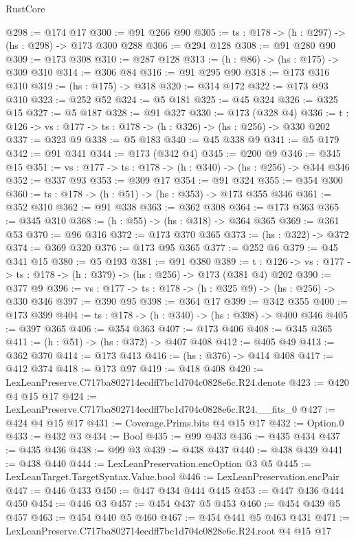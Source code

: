 \begin{lexlean}{RustCore}
\begin{coremodule}
@298 := @174 @17
@300 := @91 @266 @90
@305 := {ts : @178} -> (h : @297) -> (hs : @298) -> @173 @300 @288
@306 := @294 @128
@308 := @91 @280 @90
@309 := @173 @308
@310 := @287 @128
@313 := (h : @86) -> (hs : @175) -> @309 @310
@314 := @306 @84
@316 := @91 @295 @90
@318 := @173 @316 @310
@319 := (hs : @175) -> @318
@320 := @314 @172
@322 := @173 @93 @310
@323 := @252 @52
@324 := @5 @181
@325 := @45 @324
@326 := @325 @15
@327 := @5 @187
@328 := @91 @327
@330 := @173 (@328 @4)
@336 := {t : @126} -> {vs : @177} -> {ts : @178} -> (h : @326) -> (hs : @256) -> @330 @202
@337 := @323 @9
@338 := @5 @183
@340 := @45 @338 @9
@341 := @5 @179
@342 := @91 @341
@344 := @173 (@342 @4)
@345 := @200 @9
@346 := @345 @15
@351 := {vs : @177} -> {ts : @178} -> (h : @340) -> (hs : @256) -> @344 @346
@352 := @337 @93
@353 := @309 @17
@354 := @91 @324
@355 := @354 @300
@360 := {ts : @178} -> (h : @51) -> (hs : @353) -> @173 @355 @346
@361 := @352 @310
@362 := @91 @338
@363 := @362 @308
@364 := @173 @363
@365 := @345 @310
@368 := (h : @55) -> (hs : @318) -> @364 @365
@369 := @361 @53
@370 := @96 @316
@372 := @173 @370 @365
@373 := (hs : @322) -> @372
@374 := @369 @320
@376 := @173 @95 @365
@377 := @252 @6
@379 := @45 @341 @15
@380 := @5 @193
@381 := @91 @380
@389 := {t : @126} -> {vs : @177} -> {ts : @178} -> (h : @379) -> (hs : @256) -> @173 (@381 @4) @202
@390 := @377 @9
@396 := {vs : @177} -> {ts : @178} -> (h : @325 @9) -> (hs : @256) -> @330 @346
@397 := @390 @95
@398 := @364 @17
@399 := @342 @355
@400 := @173 @399
@404 := {ts : @178} -> (h : @340) -> (hs : @398) -> @400 @346
@405 := @397 @365
@406 := @354 @363
@407 := @173 @406
@408 := @345 @365
@411 := (h : @51) -> (hs : @372) -> @407 @408
@412 := @405 @49
@413 := @362 @370
@414 := @173 @413
@416 := (hs : @376) -> @414 @408
@417 := @412 @374
@418 := @173 @97
@419 := @418 @408
@420 := LexLeanPreserve.C717ba802714ecdff7bc1d704c0828e6c.R24.denote
@423 := @420 @4 @15 @17
@424 := LexLeanPreserve.C717ba802714ecdff7bc1d704c0828e6c.R24.__fits_0
@427 := @424 @4 @15 @17
@431 := Coverage.Prims.bits @4 @15 @17
@432 := Option.{0}
@433 := @432 @3
@434 := Bool
@435 := @99 @433
@436 := @435 @434
@437 := @435 @436
@438 := @99 @3
@439 := @438 @437
@440 := @438 @439
@441 := @438 @440
@444 := LexLeanPreservation.encOption @3 @5
@445 := LexLeanTarget.TargetSyntax.Value.bool
@446 := LexLeanPreservation.encPair
@447 := @446 @433
@450 := @447 @434 @444 @445
@453 := @447 @436 @444 @450
@454 := @446 @3
@457 := @454 @437 @5 @453
@460 := @454 @439 @5 @457
@463 := @454 @440 @5 @460
@467 := @454 @441 @5 @463 @431
@471 := LexLeanPreserve.C717ba802714ecdff7bc1d704c0828e6c.R24.root @4 @15 @17

\end{coremodule}
\end{lexlean}
